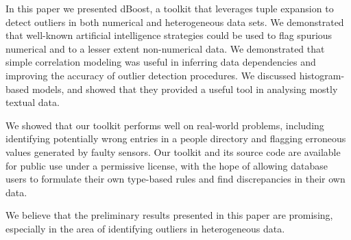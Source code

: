 
In this paper we presented dBoost, a toolkit that leverages tuple expansion to detect outliers in both numerical and heterogeneous data sets. We demonstrated that well-known artificial intelligence strategies could be used to flag spurious numerical and to a lesser extent non-numerical data. We demonstrated that simple correlation modeling was useful in inferring data dependencies and improving the accuracy of outlier detection procedures. We discussed histogram-based models, and showed that they provided a useful tool in analysing mostly textual data.

We showed that our toolkit performs well on real-world problems, including identifying potentially wrong entries in a people directory and flagging erroneous values generated by faulty sensors. Our toolkit and its source code are available for public use under a permissive license, with the hope of allowing database users to formulate their own type-based rules and find discrepancies in their own data.

We believe that the preliminary results presented in this paper are promising, especially in the area of identifying outliers in heterogeneous data.

